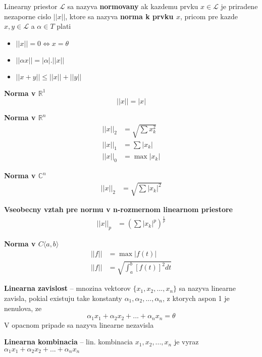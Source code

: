 \documentclass[12pt]{article}
\begin{document}
Linearny priestor $\mathcal{L}$ sa nazyva \textbf{normovany} ak kazdemu prvku $x \in \mathcal{L}$ je priradene nezaporne cislo
$||x||$, ktore sa nazyva \textbf{norma k prvku $x$}, pricom pre kazde $x,y \in \mathcal{L}$ a $\alpha \in T$ plati
\begin{itemize}
	\item $||x|| = 0 \Leftrightarrow x = \theta$
	\item $||\alpha x|| = |\alpha| . ||x||$
	\item $||x+y|| \le ||x|| + ||y||$
\end{itemize}

\textbf{Norma v $\mathbb{R}^{1}$}
\begin{equation*}
	||x|| = |x|
\end{equation*}

\textbf{Norma v $\mathbb{R}^{n}$}
\begin{align*}
	||x||_{2} &= \sqrt{\sum{x_{k}^{2}}}\\
	||x||_{1} &= \sum{|x_{k}|}\\
	||x||_{0} &= \max{|x_{k}|}
\end{align*}

\textbf{Norma v $\mathbb{C}^{n}$}
\begin{align*}
	||x||_{2} &= \sqrt{\sum{|x_{k}|^{2}}}
\end{align*}

\textbf{Vseobecny vztah pre normu v n-rozmernom linearnom priestore}
\begin{align*}
	||x||_{p} &= (\sum{|x_{k}|^{p}})^{\frac{1}{p}}
\end{align*}

\textbf{Norma v $C\langle a,b \rangle$}
\begin{align*}
	||f|| &= \max{|f(t)|} \\
	||f|| &= \sqrt{\int_{a}^{b}[f(t)]^{2}dt}
\end{align*}

\textbf{Linearna zavislost} -- mnozina vektorov $\{x_{1},x_{2},...,x_{n}\}$ sa nazyva linearne zavisla, pokial existuju take konstanty
$\alpha_{1}, \alpha_{2}, ..., \alpha_{n}$, z ktorych aspon 1 je nenulova, ze
\begin{equation*}
	\alpha_{1}x_{1} + \alpha_{2}x_{2} + ... + \alpha_{n}x_{n} = \theta
\end{equation*}
V opacnom pripade sa nazyva linearne nezavisla

\textbf{Linearna kombinacia} -- lin. kombinacia $x_{1}, x_{2}, ..., x_{n}$ je vyraz $\alpha_{1}x_{1} + \alpha_{2}x_{2} + ... + \alpha_{n}x_{n}$
\end{document}
